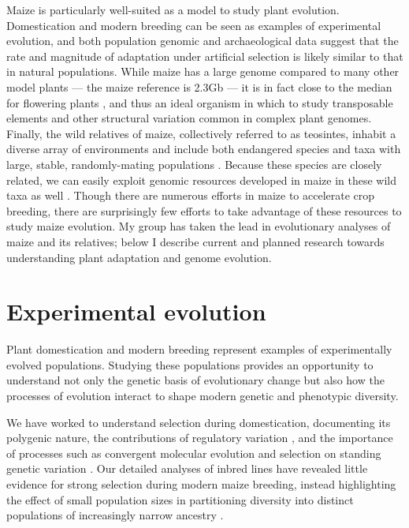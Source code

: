 \documentclass[11pt,letterpaper]{article}
\begin{document}
Maize is particularly well-suited as a model to study plant evolution.
Domestication and modern breeding can be seen as examples of experimental evolution, and both population genomic \citep{hufford2012comparative} and archaeological data \citep{purugganan2011archaeological} suggest that the rate and magnitude of adaptation under artificial selection is likely similar to that in natural populations.
While maize has a large genome compared to many other model plants --- the maize reference is 2.3Gb \citep{schnable2009b73} ---  it is in fact close to the median for flowering plants \citep{leitch2013genome}, and thus an ideal organism in which to study transposable elements and other  structural variation common in complex plant genomes.  
Finally, the wild relatives of maize, collectively referred to as teosintes, inhabit a diverse array of environments and include both endangered species and taxa with large, stable, randomly-mating populations \citep{hufford2012teosinte}.
Because these species are closely related, we can easily exploit genomic resources developed in maize in these wild taxa as well \citep[e.g.][]{pyhajarvi2013complex,fang2012megabase}.
Though there are numerous efforts in maize to accelerate crop breeding, there are surprisingly few efforts to take advantage of these resources to study maize evolution. 
My group has taken the lead in evolutionary analyses of maize and its relatives; below I describe current and planned research towards understanding plant adaptation and genome evolution.  

\section*{Experimental evolution} %

Plant domestication and modern breeding represent examples of experimentally evolved populations. Studying these populations provides an opportunity to understand not only the genetic basis of evolutionary change but also how the processes of evolution interact to shape modern genetic and phenotypic diversity.

We have worked to understand selection during domestication, documenting its polygenic nature, the contributions of regulatory variation \citep{hufford2012comparative,swanson2012reshaping}, and the importance of processes such as convergent molecular evolution \citep{wills2013many} and selection on standing genetic variation \citep{wills2013many, studer2011identification, vann2015natural}. 
Our detailed analyses of  inbred lines have revealed little evidence for strong selection during modern maize breeding, instead highlighting the effect of small population sizes in partitioning diversity into distinct populations of increasingly narrow ancestry \citep{van2012historical}.
\end{document}
